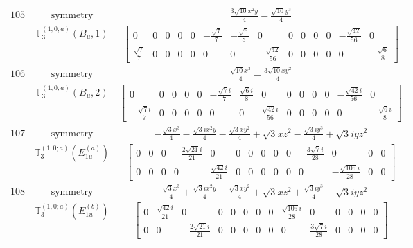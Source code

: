 \documentclass[fleqn,8pt,landscape]{jsarticle}
\begin{document}
\begin{longtable}{ccc}
$ 105 $ & $ \text{symmetry} $ & $ \frac{3 \sqrt{10} x^{2} y}{4} - \frac{\sqrt{10} y^{3}}{4} $ \\
$  $ & $ \mathbb{T}_{3}^{(1,0;a)}(B_{u},1) $ & $ \begin{bmatrix} 0 & 0 & 0 & 0 & 0 & - \frac{\sqrt{7}}{7} & - \frac{\sqrt{6}}{8} & 0 & 0 & 0 & 0 & 0 & - \frac{\sqrt{42}}{56} & 0 \\ \frac{\sqrt{7}}{7} & 0 & 0 & 0 & 0 & 0 & 0 & - \frac{\sqrt{42}}{56} & 0 & 0 & 0 & 0 & 0 & - \frac{\sqrt{6}}{8} \end{bmatrix} $ \\ \hline
$ 106 $ & $ \text{symmetry} $ & $ \frac{\sqrt{10} x^{3}}{4} - \frac{3 \sqrt{10} x y^{2}}{4} $ \\
$  $ & $ \mathbb{T}_{3}^{(1,0;a)}(B_{u},2) $ & $ \begin{bmatrix} 0 & 0 & 0 & 0 & 0 & - \frac{\sqrt{7} i}{7} & \frac{\sqrt{6} i}{8} & 0 & 0 & 0 & 0 & 0 & - \frac{\sqrt{42} i}{56} & 0 \\ - \frac{\sqrt{7} i}{7} & 0 & 0 & 0 & 0 & 0 & 0 & \frac{\sqrt{42} i}{56} & 0 & 0 & 0 & 0 & 0 & - \frac{\sqrt{6} i}{8} \end{bmatrix} $ \\ \hline
$ 107 $ & $ \text{symmetry} $ & $ - \frac{\sqrt{3} x^{3}}{4} - \frac{\sqrt{3} i x^{2} y}{4} - \frac{\sqrt{3} x y^{2}}{4} + \sqrt{3} x z^{2} - \frac{\sqrt{3} i y^{3}}{4} + \sqrt{3} i y z^{2} $ \\
$  $ & $ \mathbb{T}_{3}^{(1,0;a)}(E_{1u}^{(a)}) $ & $ \begin{bmatrix} 0 & 0 & 0 & - \frac{2 \sqrt{21} i}{21} & 0 & 0 & 0 & 0 & 0 & 0 & - \frac{3 \sqrt{7} i}{28} & 0 & 0 & 0 \\ 0 & 0 & 0 & 0 & \frac{\sqrt{42} i}{21} & 0 & 0 & 0 & 0 & 0 & 0 & - \frac{\sqrt{105} i}{28} & 0 & 0 \end{bmatrix} $ \\ \hline
$ 108 $ & $ \text{symmetry} $ & $ - \frac{\sqrt{3} x^{3}}{4} + \frac{\sqrt{3} i x^{2} y}{4} - \frac{\sqrt{3} x y^{2}}{4} + \sqrt{3} x z^{2} + \frac{\sqrt{3} i y^{3}}{4} - \sqrt{3} i y z^{2} $ \\
$  $ & $ \mathbb{T}_{3}^{(1,0;a)}(E_{1u}^{(b)}) $ & $ \begin{bmatrix} 0 & \frac{\sqrt{42} i}{21} & 0 & 0 & 0 & 0 & 0 & 0 & \frac{\sqrt{105} i}{28} & 0 & 0 & 0 & 0 & 0 \\ 0 & 0 & - \frac{2 \sqrt{21} i}{21} & 0 & 0 & 0 & 0 & 0 & 0 & \frac{3 \sqrt{7} i}{28} & 0 & 0 & 0 & 0 \end{bmatrix} $ \\ \hline

\end{longtable}
\end{document}
